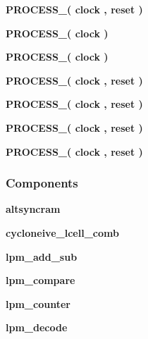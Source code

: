\begin{DoxyCompactItemize}
\item 
{\bf P\+R\+O\+C\+E\+S\+S\+\_}{\bfseries  ( {\bfseries {\bfseries {\bf clock}} \textcolor{vhdlchar}{ }} , {\bfseries {\bfseries {\bf reset}} \textcolor{vhdlchar}{ }} )}
\item 
{\bf P\+R\+O\+C\+E\+S\+S\+\_}{\bfseries  ( {\bfseries {\bfseries {\bf clock}} \textcolor{vhdlchar}{ }} )}
\item 
{\bf P\+R\+O\+C\+E\+S\+S\+\_}{\bfseries  ( {\bfseries {\bfseries {\bf clock}} \textcolor{vhdlchar}{ }} )}
\item 
{\bf P\+R\+O\+C\+E\+S\+S\+\_}{\bfseries  ( {\bfseries {\bfseries {\bf clock}} \textcolor{vhdlchar}{ }} , {\bfseries {\bfseries {\bf reset}} \textcolor{vhdlchar}{ }} )}
\item 
{\bf P\+R\+O\+C\+E\+S\+S\+\_}{\bfseries  ( {\bfseries {\bfseries {\bf clock}} \textcolor{vhdlchar}{ }} , {\bfseries {\bfseries {\bf reset}} \textcolor{vhdlchar}{ }} )}
\item 
{\bf P\+R\+O\+C\+E\+S\+S\+\_}{\bfseries  ( {\bfseries {\bfseries {\bf clock}} \textcolor{vhdlchar}{ }} , {\bfseries {\bfseries {\bf reset}} \textcolor{vhdlchar}{ }} )}
\item 
{\bf P\+R\+O\+C\+E\+S\+S\+\_}{\bfseries  ( {\bfseries {\bfseries {\bf clock}} \textcolor{vhdlchar}{ }} , {\bfseries {\bfseries {\bf reset}} \textcolor{vhdlchar}{ }} )}
\end{DoxyCompactItemize}
\subsubsection*{Components}
 \begin{DoxyCompactItemize}
\item 
{\bf altsyncram}  {\bfseries }  
\item 
{\bf cycloneive\+\_\+lcell\+\_\+comb}  {\bfseries }  
\item 
{\bf lpm\+\_\+add\+\_\+sub}  {\bfseries }  
\item 
{\bf lpm\+\_\+compare}  {\bfseries }  
\item 
{\bf lpm\+\_\+counter}  {\bfseries }  
\item 
{\bf lpm\+\_\+decode}  {\bfseries }  
\end{DoxyCompactItemize}
